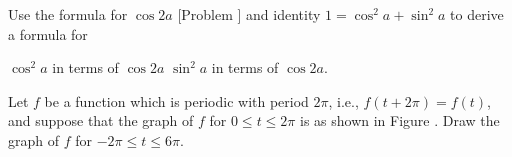 \begin{exercises}
Use the formula for $\cos 2a$ [Problem ]
and identity $1 = \cos^2a + \sin^2a$
to derive a formula for
\begin{exenum}
\x
$\cos^2a$ in terms of $\cos 2a$
\x
$\sin^2a$ in terms of $\cos 2a$.
\end{exenum}

Let $f$ be a function which is periodic with period
$2\pi$, i.e., $f(t+2\pi) = f(t)$,
and suppose that the graph of $f$ for
$0 \leq t \leq 2\pi$ is as shown in Figure .
Draw the graph of $f$ for
$-2\pi \leq t \leq 6\pi$.

\end{exercises}
